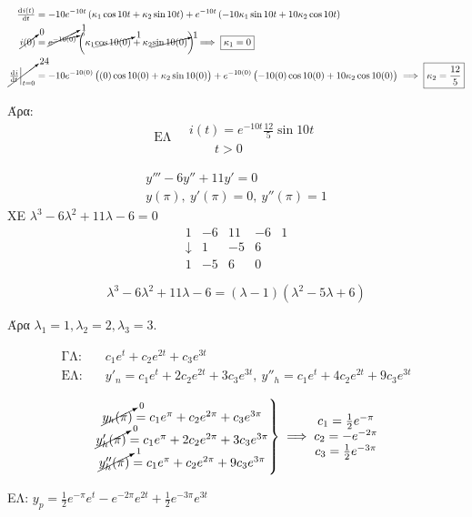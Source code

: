 \documentclass[11pt,a4paper,titlepage,final]{article}
\begin{document}
\begin{exercise*}{5.5}
\begin{align*}
\od{i(t)}{t}&=-10e^{-10t}\left(
\kappa_1\cos10t+\kappa_2\sin10t
\right)+
e^{-10t}\left(
-10\kappa_1\sin10t+10\kappa_2\cos10t
\right)\\
\cancelto{0}{i(0)}&=\cancelto{1}{e^{\cancelto{0}{-10(0)}}}\left(
\kappa_1 \cancelto{1}{\cos10(0)} + \kappa_2 \cancelto{1}{\sin10(0)}
\right) \implies \boxed{
\kappa_1=0
}\\
\cancelto{24}{\left.\od{i}{t}\right|_{t=0}} &=
-10e^{-10(0)}\left(
(0)\cos10(0)+\kappa_2\sin10(0)
\right)+e^{-10(0)}\left(-10(0)\cos10(0)+10\kappa_2\cos10(0)\right)
\implies \boxed{\kappa_2=\frac{12}{5}}
\end{align*}

Άρα:
\[
\boxed{
\text{ΕΛ} \quad
\begin{array}{l}
i(t) = e^{-10t} \frac{12}{5}\sin10t\\
\qquad t>0
\end{array}
}
\]

\end{exercise*}

\begin{exercise*}{5.16}
	\begin{gather*}
	y'''-6y''+11y'=0\\
	y(\pi),\ y'(\pi)=0,\ y''(\pi)=1
	\end{gather*}
	\tcblower
	ΧΕ \(\lambda^3-6\lambda^2+11\lambda-6=0\)
	\[
	\begin{array}{rrrr|l}
	1&-6&11&-6 & 1\\
	\downarrow & 1 & -5 & 6 & \\
	1 & -5 & 6 & 0
	\end{array}
	\]
	
	\[
	\lambda ^3-6\lambda ^2+11\lambda -6=(\lambda -1)(\lambda ^2-5\lambda +6)
	\]
	
	Άρα $\lambda_1=1,\lambda _2=2,\lambda _3=3$.
	
	\[
	\begin{matrix}
	\text{ΓΛ:} \quad & c_1e^t+c_2e^{2t}+c_3e^{3t}\\
	\text{ΕΛ:} \quad & y'_n = c_1e^t+2c_2e^{2t}+3c_3e^{3t},\ y''_h = c_1e^t+4c_2e^{2t}+9c_3e^{3t}
	\end{matrix}
	\]
	
	\[
	\left.
	\begin{matrix}
	\cancelto{0}{y_h(\pi)}=c_1e^\pi +c_2e^{2\pi}+c_3e^{3\pi}\\
	\cancelto{0}{y'_h(\pi)}=c_1e^\pi +2c_2e^{2\pi}+3c_3e^{3\pi}\\
	\cancelto{1}{y''_h(\pi)} = c_1e^\pi+c_2e^{2\pi}+9c_3e^{3\pi}
	\end{matrix}
	\right\rbrace
	\implies
	\begin{matrix}
	c_1 = \frac{1}{2}e^{-\pi}\\
	c_2 = -e^{-2\pi}\\
	c_3 = \frac{1}{2}e^{-3\pi}
	\end{matrix}
	\]
	
	ΕΛ: \(y_p = \frac{1}{2}e^{-\pi}e^t-e^{-2\pi}e^{2t}+\frac{1}{2}e^{-3\pi}e^{3t}\)
\end{exercise*}
\end{document}
